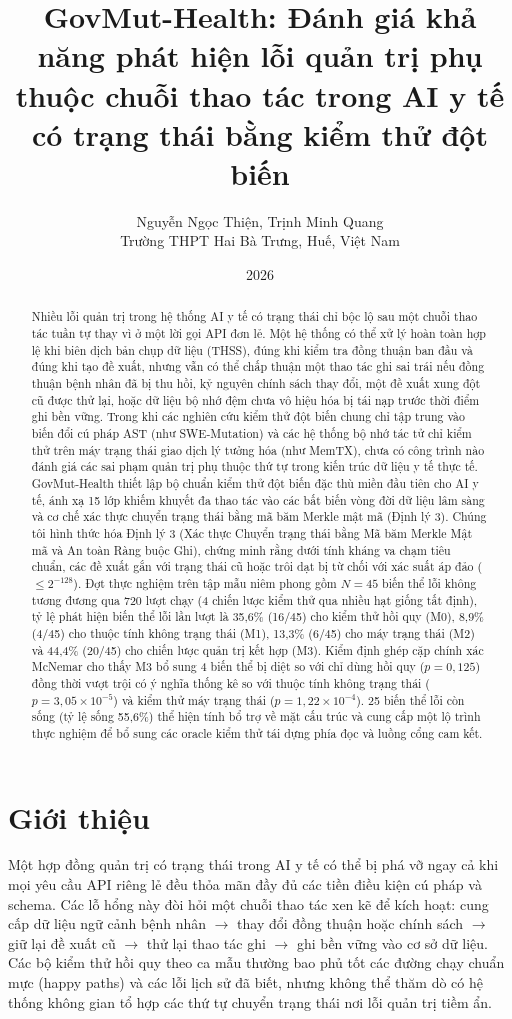 \documentclass[11pt]{article}
\title{\textbf{GovMut-Health: Đánh giá khả năng phát hiện lỗi quản trị phụ thuộc chuỗi thao tác trong AI y tế có trạng thái bằng kiểm thử đột biến}}
\author{Nguyễn Ngọc Thiện, Trịnh Minh Quang \\ Trường THPT Hai Bà Trưng, Huế, Việt Nam}
\date{2026}
\begin{document}
\maketitle
\begin{abstract}
Nhiều lỗi quản trị trong hệ thống AI y tế có trạng thái chỉ bộc lộ sau một chuỗi thao tác tuần tự thay vì ở một lời gọi API đơn lẻ. Một hệ thống có thể xử lý hoàn toàn hợp lệ khi biên dịch bản chụp dữ liệu (THSS), đúng khi kiểm tra đồng thuận ban đầu và đúng khi tạo đề xuất, nhưng vẫn có thể chấp thuận một thao tác ghi sai trái nếu đồng thuận bệnh nhân đã bị thu hồi, kỷ nguyên chính sách thay đổi, một đề xuất xung đột cũ được thử lại, hoặc dữ liệu bộ nhớ đệm chưa vô hiệu hóa bị tái nạp trước thời điểm ghi bền vững. Trong khi các nghiên cứu kiểm thử đột biến chung chỉ tập trung vào biến đổi cú pháp AST (như SWE-Mutation) và các hệ thống bộ nhớ tác tử chỉ kiểm thử trên máy trạng thái giao dịch lý tưởng hóa (như MemTX), chưa có công trình nào đánh giá các sai phạm quản trị phụ thuộc thứ tự trong kiến trúc dữ liệu y tế thực tế. GovMut-Health thiết lập bộ chuẩn kiểm thử đột biến đặc thù miền đầu tiên cho AI y tế, ánh xạ 15 lớp khiếm khuyết đa thao tác vào các bất biến vòng đời dữ liệu lâm sàng và cơ chế xác thực chuyển trạng thái bằng mã băm Merkle mật mã (Định lý 3). Chúng tôi hình thức hóa Định lý 3 (Xác thực Chuyển trạng thái bằng Mã băm Merkle Mật mã và An toàn Ràng buộc Ghi), chứng minh rằng dưới tính kháng va chạm tiêu chuẩn, các đề xuất gắn với trạng thái cũ hoặc trôi dạt bị từ chối với xác suất áp đảo ($\le 2^{-128}$). Đợt thực nghiệm trên tập mẫu niêm phong gồm $N = 45$ biến thể lỗi không tương đương qua 720 lượt chạy (4 chiến lược kiểm thử qua nhiều hạt giống tất định), tỷ lệ phát hiện biến thể lỗi lần lượt là 35,6\% (16/45) cho kiểm thử hồi quy (M0), 8,9\% (4/45) cho thuộc tính không trạng thái (M1), 13,3\% (6/45) cho máy trạng thái (M2) và 44,4\% (20/45) cho chiến lược quản trị kết hợp (M3). Kiểm định ghép cặp chính xác McNemar cho thấy M3 bổ sung 4 biến thể bị diệt so với chỉ dùng hồi quy ($p = 0{,}125$) đồng thời vượt trội có ý nghĩa thống kê so với thuộc tính không trạng thái ($p = 3{,}05 \times 10^{-5}$) và kiểm thử máy trạng thái ($p = 1{,}22 \times 10^{-4}$). 25 biến thể lỗi còn sống (tỷ lệ sống 55,6\%) thể hiện tính bổ trợ về mặt cấu trúc và cung cấp một lộ trình thực nghiệm để bổ sung các oracle kiểm thử tái dựng phía đọc và luồng cổng cam kết.
\end{abstract}

\section{Giới thiệu}
Một hợp đồng quản trị có trạng thái trong AI y tế có thể bị phá vỡ ngay cả khi mọi yêu cầu API riêng lẻ đều thỏa mãn đầy đủ các tiền điều kiện cú pháp và schema. Các lỗ hổng này đòi hỏi một chuỗi thao tác xen kẽ để kích hoạt: cung cấp dữ liệu ngữ cảnh bệnh nhân $\to$ thay đổi đồng thuận hoặc chính sách $\to$ giữ lại đề xuất cũ $\to$ thử lại thao tác ghi $\to$ ghi bền vững vào cơ sở dữ liệu. Các bộ kiểm thử hồi quy theo ca mẫu thường bao phủ tốt các đường chạy chuẩn mực (happy paths) và các lỗi lịch sử đã biết, nhưng không thể thăm dò có hệ thống không gian tổ hợp các thứ tự chuyển trạng thái nơi lỗi quản trị tiềm ẩn.
\end{document}
